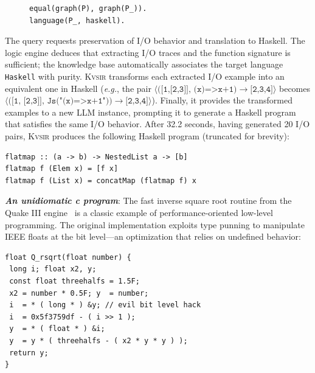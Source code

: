 \documentclass[noacm,sigplan,review]{acmart}
\def\eg{{\em e.g.}, }
\newcommand{\sys}{{\scshape Kv{\textalpha}sir}\xspace}
\newcommand{\heading}[1]{\vspace{2pt}\noindent\textbf{\emph{#1}}:\enspace}
\begin{document}
\begin{figure}
\vspace{-10pt}
\begin{verbatim}
equal(graph(P), graph(P_)).
language(P_, haskell).
\end{verbatim}
\end{figure}
The query requests preservation of I/O behavior and translation to Haskell. The
logic engine deduces that extracting I/O traces and the function signature is
sufficient; the knowledge base automatically associates the target language
\texttt{Haskell} with purity.
\sys transforms each extracted I/O example into an equivalent one in Haskell (\eg 
the pair $\langle\texttt{([1,[2,3]], (x)=>x+1)}\to\texttt{[2,3,4]}\rangle$ 
becomes $\langle(\texttt{[1, [2,3]], Js("(x)=>x+1"))}\to\texttt{[2,3,4]}\rangle$).
Finally, it provides the transformed examples to a new LLM instance, prompting it
to generate a Haskell program that satisfies the same I/O behavior.
After 32.2 seconds, having generated 20 I/O pairs, \sys produces the following
Haskell program (truncated for brevity):
\begin{verbatim}
flatmap :: (a -> b) -> NestedList a -> [b]
flatmap f (Elem x) = [f x]
flatmap f (List x) = concatMap (flatmap f) x
\end{verbatim}

\heading{An unidiomatic c program}
The fast inverse square root routine from the Quake III
engine~\cite{fast_inv_sqrt}
is a classic example of performance-oriented low-level programming.
The original implementation exploits type punning to manipulate IEEE
floats at the bit level---an optimization that relies on undefined behavior:

\begin{verbatim}
float Q_rsqrt(float number) {
 long i; float x2, y;
 const float threehalfs = 1.5F;
 x2 = number * 0.5F; y  = number;
 i  = * ( long * ) &y; // evil bit level hack
 i  = 0x5f3759df - ( i >> 1 );
 y  = * ( float * ) &i;
 y  = y * ( threehalfs - ( x2 * y * y ) );
 return y;
}
\end{verbatim}
\end{document}

